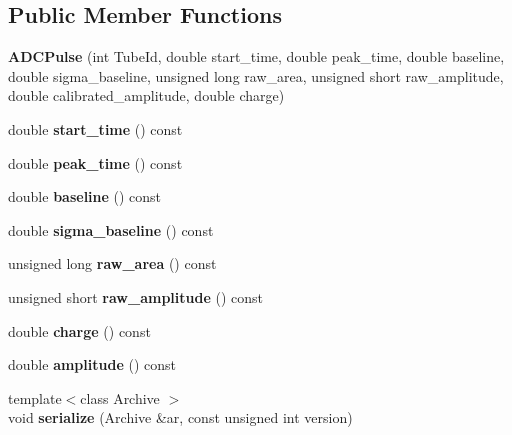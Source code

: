 \subsection*{Public Member Functions}
\begin{DoxyCompactItemize}
\item 
\hypertarget{classADCPulse_a98b82ea9459a5fca7947a855fb8c7405}{
{\bfseries ADCPulse} (int TubeId, double start\_\-time, double peak\_\-time, double baseline, double sigma\_\-baseline, unsigned long raw\_\-area, unsigned short raw\_\-amplitude, double calibrated\_\-amplitude, double charge)}
\label{classADCPulse_a98b82ea9459a5fca7947a855fb8c7405}

\item 
\hypertarget{classADCPulse_aba2eb2e6400677d592ef1685ba2ae5a9}{
double {\bfseries start\_\-time} () const }
\label{classADCPulse_aba2eb2e6400677d592ef1685ba2ae5a9}

\item 
\hypertarget{classADCPulse_ac55a1faf2cf205fbdc859daece64a021}{
double {\bfseries peak\_\-time} () const }
\label{classADCPulse_ac55a1faf2cf205fbdc859daece64a021}

\item 
\hypertarget{classADCPulse_a4900e0a75c4981491f8609428888a6bc}{
double {\bfseries baseline} () const }
\label{classADCPulse_a4900e0a75c4981491f8609428888a6bc}

\item 
\hypertarget{classADCPulse_a824ed4ba627f7641ff70adf2fe3b026f}{
double {\bfseries sigma\_\-baseline} () const }
\label{classADCPulse_a824ed4ba627f7641ff70adf2fe3b026f}

\item 
\hypertarget{classADCPulse_a692780da124b59770356393f16299c49}{
unsigned long {\bfseries raw\_\-area} () const }
\label{classADCPulse_a692780da124b59770356393f16299c49}

\item 
\hypertarget{classADCPulse_a7a09c65e5b638c6a2df3e437219f04f8}{
unsigned short {\bfseries raw\_\-amplitude} () const }
\label{classADCPulse_a7a09c65e5b638c6a2df3e437219f04f8}

\item 
\hypertarget{classADCPulse_aad38764b5eabe9d858309bc06cf73424}{
double {\bfseries charge} () const }
\label{classADCPulse_aad38764b5eabe9d858309bc06cf73424}

\item 
\hypertarget{classADCPulse_adf6f2ab6b4c28e425dd7567a70099826}{
double {\bfseries amplitude} () const }
\label{classADCPulse_adf6f2ab6b4c28e425dd7567a70099826}

\item 
\hypertarget{classADCPulse_a454d731a107182274df51d3ccf116e52}{
{\footnotesize template$<$class Archive $>$ }\\void {\bfseries serialize} (Archive \&ar, const unsigned int version)}
\label{classADCPulse_a454d731a107182274df51d3ccf116e52}

\end{DoxyCompactItemize}
